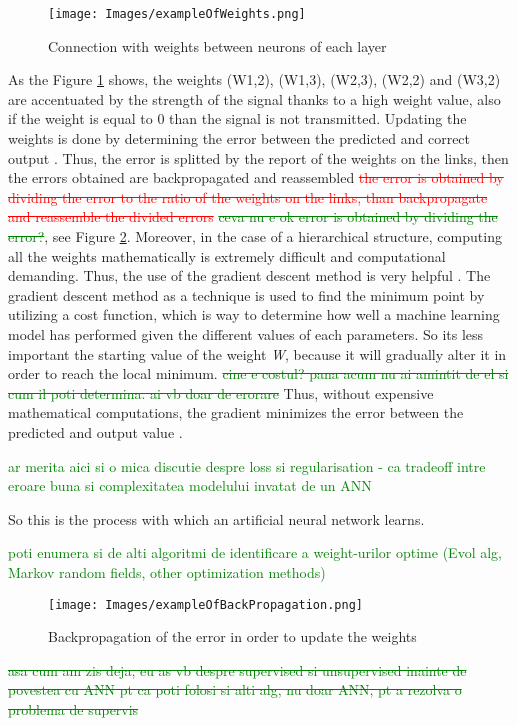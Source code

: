 \begin{figure}[h!]
    \centering
    \texttt{[image: Images/exampleOfWeights.png]}
    \caption{Connection with weights between neurons of each layer \cite{ANNBasic}}
    \label{fig:ex_weight}
\end{figure}

As the Figure \ref{fig:ex_weight} shows, the weights (W1,2), (W1,3), (W2,3), (W2,2) and (W3,2) are accentuated by the strength of the signal thanks to a high weight value, also if the weight is equal to 0 than the signal is not transmitted. Updating the weights is done by determining the error between the predicted and correct output \cite{ANNBasic}. Thus, the error is splitted by the report of the weights on the links, then the errors obtained are backpropagated and reassembled \textcolor{red}{\sout{the error is obtained by dividing the error to the ratio of the weights on the links, than backpropagate and reassemble the divided errors}} \textcolor{green}{\sout{ceva nu e ok error is obtained by dividing the error?}}, see Figure \ref{fig:ex_backprog}. Moreover, in the case of a hierarchical structure, computing all the weights mathematically is extremely difficult and computational demanding. Thus, the use of the gradient descent method is very helpful \cite{ANNBasic, OnlineApprox, NNTricks}. The gradient descent method as a technique is used to find the minimum point by utilizing a cost function, which is way to determine how well a machine learning model has performed given the different values of each parameters. So its less important the starting value of the weight \textit{W}, because it will gradually alter it in order to reach the local minimum. \textcolor{green}{\sout{cine e costul? pana acum nu ai amintit de el si cum il poti determina. ai vb doar de erorare}} Thus, without expensive mathematical computations, the gradient minimizes the error between the predicted and output value \cite{ANNBasic}.

\textcolor{green}{ar merita aici si o mica discutie despre loss si regularisation - ca tradeoff intre eroare buna si complexitatea modelului invatat de un ANN}

So this is the process with which an artificial neural network learns.

\textcolor{green}{poti enumera si de alti algoritmi de identificare a weight-urilor optime (Evol alg, Markov random fields, other optimization methods)}

\begin{figure}[h!]
    \centering
    \texttt{[image: Images/exampleOfBackPropagation.png]}
    \caption{Backpropagation of the error in order to update the weights \cite{ANNBasic}}
    \label{fig:ex_backprog}
\end{figure}

\textcolor{green}{\sout{asa cum am zis deja, eu as vb despre supervised si unsupervised inainte de povestea cu ANN pt ca poti folosi si alti alg, nu doar ANN, pt a rezolva o problema de supervis}
}